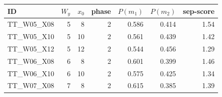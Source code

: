 \begin{tabular}{lrrrrrr}
\toprule
ID & $W_y$ & $x_0$ & phase & $P(m_1)$ & $P(m_2)$ & sep-score \\
\midrule
TT\_W05\_X08 & 5 & 8 & 2 & 0.586 & 0.414 & 1.54 \\
TT\_W05\_X10 & 5 & 10 & 2 & 0.561 & 0.439 & 1.42 \\
TT\_W05\_X12 & 5 & 12 & 2 & 0.544 & 0.456 & 1.29 \\
TT\_W06\_X08 & 6 & 8 & 2 & 0.601 & 0.399 & 1.46 \\
TT\_W06\_X10 & 6 & 10 & 2 & 0.575 & 0.425 & 1.34 \\
TT\_W07\_X08 & 7 & 8 & 2 & 0.615 & 0.385 & 1.39 \\
\bottomrule
\end{tabular}